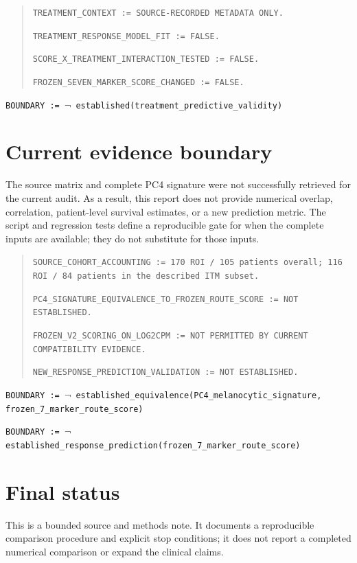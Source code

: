\documentclass[11pt]{article}
\begin{document}
\begin{quote}
\texttt{TREATMENT\_CONTEXT := SOURCE-RECORDED METADATA ONLY.}

\texttt{TREATMENT\_RESPONSE\_MODEL\_FIT := FALSE.}

\texttt{SCORE\_X\_TREATMENT\_INTERACTION\_TESTED := FALSE.}

\texttt{FROZEN\_SEVEN\_MARKER\_SCORE\_CHANGED := FALSE.}
\end{quote}

\texttt{BOUNDARY := $\neg$ established(treatment\_predictive\_validity)}

\section{Current evidence boundary}

The source matrix and complete PC4 signature were not successfully retrieved for the current audit. As a result, this report does not provide numerical overlap, correlation, patient-level survival estimates, or a new prediction metric. The script and regression tests define a reproducible gate for when the complete inputs are available; they do not substitute for those inputs.

\begin{quote}
\texttt{SOURCE\_COHORT\_ACCOUNTING := 170 ROI / 105 patients overall; 116 ROI / 84 patients in the described ITM subset.}

\texttt{PC4\_SIGNATURE\_EQUIVALENCE\_TO\_FROZEN\_ROUTE\_SCORE := NOT ESTABLISHED.}

\texttt{FROZEN\_V2\_SCORING\_ON\_LOG2CPM := NOT PERMITTED BY CURRENT COMPATIBILITY EVIDENCE.}

\texttt{NEW\_RESPONSE\_PREDICTION\_VALIDATION := NOT ESTABLISHED.}
\end{quote}

\texttt{BOUNDARY := $\neg$ established\_equivalence(PC4\_melanocytic\_signature, frozen\_7\_marker\_route\_score)}

\texttt{BOUNDARY := $\neg$ established\_response\_prediction(frozen\_7\_marker\_route\_score)}

\section{Final status}

This is a bounded source and methods note. It documents a reproducible comparison procedure and explicit stop conditions; it does not report a completed numerical comparison or expand the clinical claims.
\end{document}

